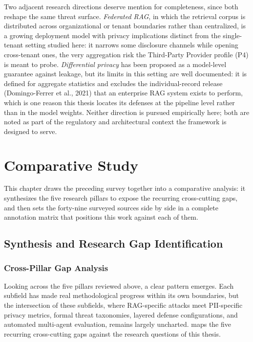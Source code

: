\documentclass[12pt,a4paper]{report}
\begin{document}
Two adjacent research directions deserve mention for completeness, since both reshape the same threat
surface. \emph{Federated RAG}, in which the retrieval corpus is distributed across organizational or
tenant boundaries rather than centralized, is a growing deployment model with privacy implications
distinct from the single-tenant setting studied here: it narrows some disclosure channels while
opening cross-tenant ones, the very aggregation risk the Third-Party Provider profile (P4) is meant
to probe. \emph{Differential privacy} has been proposed as a model-level guarantee against leakage,
but its limits in this setting are well documented: it is defined for aggregate statistics and
excludes the individual-record release (Domingo-Ferrer et al., 2021) that an enterprise RAG system
exists to perform, which is one reason this thesis locates its defenses at the pipeline level rather
than in the model weights. Neither direction is pursued empirically here; both are noted as part of
the regulatory and architectural context the framework is designed to serve.



\chapter{Comparative Study}
\label{ch:comparative}

This chapter draws the preceding survey together into a comparative analysis: it synthesizes the
five research pillars to expose the recurring cross-cutting gaps, and then sets the forty-nine
surveyed sources side by side in a complete annotation matrix that positions this work against each
of them.

\section{Synthesis and Research Gap Identification}
\label{sec:synthesis}

\subsection{Cross-Pillar Gap Analysis}

Looking across the five pillars reviewed above, a clear pattern emerges. Each subfield has made real methodological progress within its own boundaries, but the intersection of these subfields, where RAG-specific attacks meet PII-specific privacy metrics, formal threat taxonomies, layered defense configurations, and automated multi-agent evaluation, remains largely uncharted.  maps the five recurring cross-cutting gaps against the research questions of this thesis.
\end{document}
